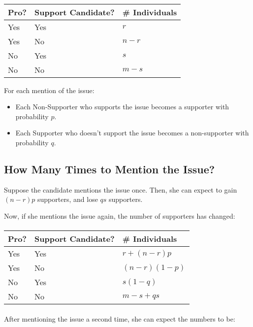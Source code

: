 \documentclass{article}
\begin{document}
\paragraph{}
\begin{tabular}{|l|l|l|}
\hline
Pro? & Support Candidate? & \# Individuals\\
\hline
Yes & Yes & $r$ \\
Yes & No & $n-r$ \\
No & Yes & $s$ \\
No & No & $m-s$ \\
\hline
\end{tabular}

For each mention of the issue:
\begin{itemize}
\item Each Non-Supporter who supports the issue becomes a supporter
	with probability $p$.
\item Each Supporter who doesn't support the issue becomes a non-supporter
	with probability $q$.
\end{itemize}

\subsection{How Many Times to Mention the Issue?}

Suppose the candidate mentions the issue once.
Then, she can expect to gain $ (n-r) p$ supporters,	
	and lose $ q s $ supporters.

Now, if she mentions the issue again, the number of supporters
	has changed:

\paragraph{}
\begin{tabular}{|l|l|l|}
\hline
Pro? & Support Candidate? & \# Individuals\\
\hline
Yes & Yes & $r + (n - r) p$ \\
Yes & No & $(n-r)(1-p)$ \\
No & Yes & $s(1 - q)$ \\
No & No & $m-s + q s$ \\
\hline
\end{tabular}

\paragraph{}
After mentioning the issue a second time, she can expect the numbers to be:
\end{document}
